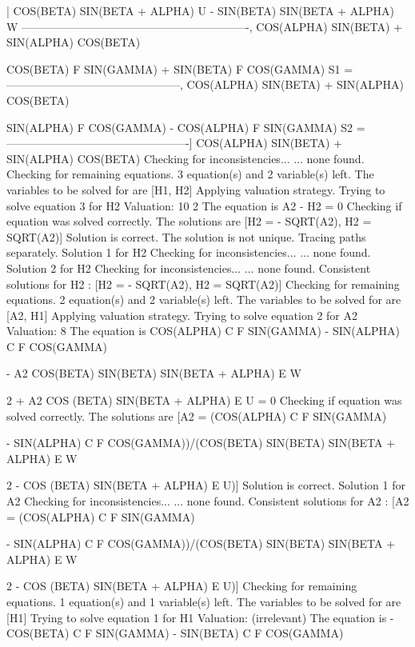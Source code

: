 \begin{literatim}{|}
COS(BETA) SIN(BETA + ALPHA) U - SIN(BETA) SIN(BETA + ALPHA) W
-------------------------------------------------------------, 
         COS(ALPHA) SIN(BETA) + SIN(ALPHA) COS(BETA)

     COS(BETA) F SIN(GAMMA) + SIN(BETA) F COS(GAMMA)
S1 = -----------------------------------------------, 
       COS(ALPHA) SIN(BETA) + SIN(ALPHA) COS(BETA)

     SIN(ALPHA) F COS(GAMMA) - COS(ALPHA) F SIN(GAMMA)
S2 = -------------------------------------------------]
        COS(ALPHA) SIN(BETA) + SIN(ALPHA) COS(BETA)
Checking for inconsistencies...
... none found.
Checking for remaining equations.
3 equation(s) and 2 variable(s) left.
The variables to be solved for are [H1, H2]
Applying valuation strategy.
Trying to solve equation 3 for H2
Valuation: 10
                       2
The equation is A2 - H2  = 0
Checking if equation was solved correctly.
The solutions are [H2 = - SQRT(A2), H2 = SQRT(A2)]
Solution is correct.
The solution is not unique. Tracing paths separately.
Solution 1 for H2
Checking for inconsistencies...
... none found.
Solution 2 for H2
Checking for inconsistencies...
... none found.
Consistent solutions for H2 : [H2 = - SQRT(A2), H2 = SQRT(A2)]
Checking for remaining equations.
2 equation(s) and 2 variable(s) left.
The variables to be solved for are [A2, H1]
Applying valuation strategy.
Trying to solve equation 2 for A2
Valuation: 8
The equation is COS(ALPHA) C F SIN(GAMMA) - SIN(ALPHA) C F COS(GAMMA)

 - A2 COS(BETA) SIN(BETA) SIN(BETA + ALPHA) E W

         2
 + A2 COS (BETA) SIN(BETA + ALPHA) E U = 0
Checking if equation was solved correctly.
The solutions are [A2 = (COS(ALPHA) C F SIN(GAMMA)

 - SIN(ALPHA) C F COS(GAMMA))/(COS(BETA) SIN(BETA) SIN(BETA + ALPHA) E W

      2
 - COS (BETA) SIN(BETA + ALPHA) E U)]
Solution is correct.
Solution 1 for A2
Checking for inconsistencies...
... none found.
Consistent solutions for A2 : [A2 = (COS(ALPHA) C F SIN(GAMMA)

 - SIN(ALPHA) C F COS(GAMMA))/(COS(BETA) SIN(BETA) SIN(BETA + ALPHA) E W

      2
 - COS (BETA) SIN(BETA + ALPHA) E U)]
Checking for remaining equations.
1 equation(s) and 1 variable(s) left.
The variables to be solved for are [H1]
Trying to solve equation 1 for H1
Valuation: (irrelevant)
The equation is - COS(BETA) C F SIN(GAMMA) - SIN(BETA) C F COS(GAMMA)


\end{literatim}
